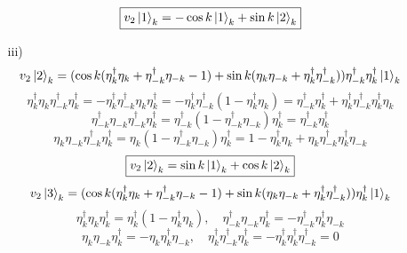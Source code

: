 \documentclass[12pt]{article}
\theoremstyle{definition}
\begin{document}
\begin{enumerate}
\begin{itemize}
\begin{equation}
        \end{equation}
        \begin{equation}
            \boxed{v_2\ket{1}_k=-\cos k\ket{1}_k+\sin k\ket{2}_k}
        \end{equation}
        \item[iii)]
        \begin{equation}
            v_2\ket{2}_k=(\cos k(\eta^\dagger_k\eta_k+\eta^\dagger_{-k}\eta_{-k}-1)+\sin k(\eta_k\eta_{-k}+\eta^\dagger_k\eta_{-k}^\dagger))\eta^\dagger_{-k}\eta^\dagger_k\ket{1}_k
        \end{equation}
        \begin{equation}
            \eta^\dagger_k\eta_k\eta^\dagger_{-k}\eta^\dagger_k=-\eta^\dagger_k\eta^\dagger_{-k}\eta_k\eta^\dagger_k=-\eta^\dagger_k\eta^\dagger_{-k}(1-\eta^\dagger_k\eta_k)=\eta^\dagger_{-k}\eta^\dagger_k+\eta^\dagger_k\eta^\dagger_{-k}\eta^\dagger_k\eta_k
        \end{equation}
        \begin{equation}
            \eta^\dagger_{-k}\eta_{-k}\eta^\dagger_{-k}\eta^\dagger_k=\eta^\dagger_{-k}(1-\eta^\dagger_{-k}\eta_{-k})\eta^\dagger_k=\eta^\dagger_{-k}\eta^\dagger_k
        \end{equation}
        \begin{equation}
            \eta_k\eta_{-k}\eta^\dagger_{-k}\eta^\dagger_k=\eta_k(1-\eta^\dagger_{-k}\eta_{-k})\eta^\dagger_k=1-\eta^\dagger_k\eta_k+\eta_k\eta^\dagger_{-k}\eta^\dagger_k\eta_{-k}
        \end{equation}
        \begin{equation}
            \boxed{v_2\ket{2}_k=\sin k\ket{1}_k+\cos k\ket{2}_k}
        \end{equation}
        \begin{equation}
            v_2\ket{3}_k=(\cos k(\eta^\dagger_k\eta_k+\eta^\dagger_{-k}\eta_{-k}-1)+\sin k(\eta_k\eta_{-k}+\eta^\dagger_k\eta_{-k}^\dagger))\eta^\dagger_k\ket{1}_k
        \end{equation}
        \begin{equation}
            \eta^\dagger_k\eta_k\eta^\dagger_k=\eta^\dagger_k(1-\eta^\dagger_k\eta_k),\quad\eta^\dagger_{-k}\eta_{-k}\eta^\dagger_k=-\eta^\dagger_{-k}\eta^\dagger_k\eta_{-k} 
        \end{equation}
        \begin{equation}
            \eta_k\eta_{-k}\eta^\dagger_k=-\eta_k\eta^\dagger_k\eta_{-k},\quad\eta^\dagger_k\eta_{-k}^\dagger\eta^\dagger_k=-\eta^\dagger_k\eta^\dagger_k\eta_{-k}^\dagger=0

\end{equation}
\end{itemize}
\end{enumerate}
\end{document}
